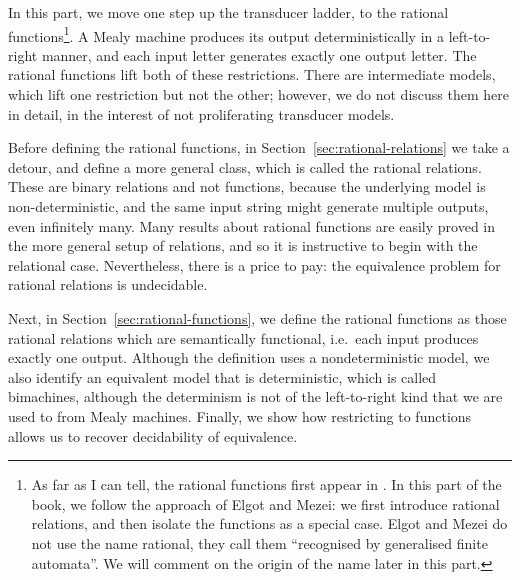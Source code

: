 In this part, we move one step up the transducer ladder, to the rational functions\footnote{As far as I can tell, the rational functions first appear in \cite{elgotMezei1965}. In this part of the book, we follow the approach of Elgot and Mezei: we first introduce rational relations, and then isolate the functions as a special case. Elgot and Mezei do not use the name  rational, they call them ``recognised by generalised finite automata''. We will comment on the origin of the name later in this part. }.
A Mealy machine produces its output deterministically in a left-to-right manner, and each input letter generates exactly one output letter. The rational functions lift both of these restrictions. There are intermediate models, which lift one restriction but not the other; however, we do not discuss them here in detail, in the interest of not proliferating transducer models.

Before defining the rational functions, in Section~\ref{sec:rational-relations} we take a detour, and   define a more general class, which is called the rational relations. These are binary relations and not functions, because the underlying model is non-deterministic, and the same input string might generate multiple outputs, even infinitely many. Many results about rational functions are easily proved in the more general setup of relations, and so it is instructive to begin with the relational case. Nevertheless, there is a price to pay: the equivalence problem for rational relations is undecidable.

Next, in Section~\ref{sec:rational-functions}, we define the rational functions as those rational relations which are semantically functional, i.e.~each input produces exactly one output. Although the definition uses a nondeterministic model, we also identify an equivalent model that is deterministic, which is called bimachines, although the determinism is not of the left-to-right kind that we are used to from Mealy machines. Finally, we show how restricting to functions allows us to recover decidability of equivalence. 

